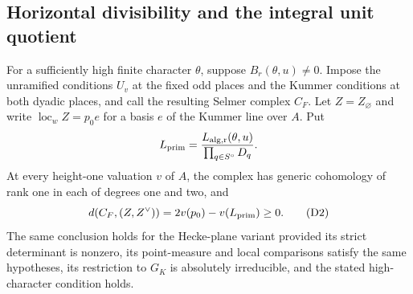 \subsection{Horizontal divisibility and the integral unit quotient}

\begin{proposition}\label{split-local:horizontal}
For a sufficiently high finite character \(\theta\), suppose \(B_r(\theta,u)\ne0\). Impose the unramified conditions \(U_v\) at the fixed odd places and the Kummer conditions at both dyadic places, and call the resulting Selmer complex \(C_F\). Let \(Z=Z_\varnothing\) and write \(\operatorname{loc}_wZ=p_0e\) for a basis \(e\) of the Kummer line over \(A\). Put
\[
 L_{\rm prim}=\frac{L_{\rm alg,r}(\theta,u)}{\prod_{q\in S^\circ}D_q}.
\]
At every height-one valuation \(v\) of \(A\), the complex has generic cohomology of rank one in each of degrees one and two, and
\[
 d(C_F,(Z,Z^\vee))=2v(p_0)-v(L_{\rm prim})\ge0.
 \tag{D2}\label{eq:D2}
\]
The same conclusion holds for the Hecke-plane variant provided its strict determinant is nonzero, its point-measure and local comparisons satisfy the same hypotheses, its restriction to \(G_K\) is absolutely irreducible, and the stated high-character condition holds.
\end{proposition}


